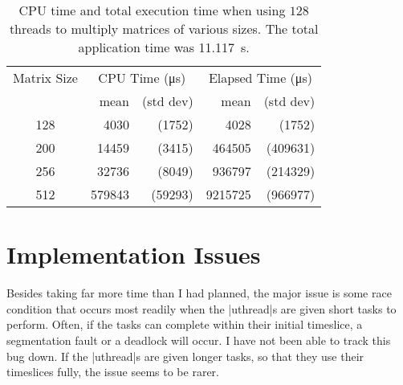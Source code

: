 \documentclass[]{article}
\begin{document}
\begin{table}[h]
  \begin{center}
    \label{tab}
    \begin{minipage}{.8\linewidth}
      \caption{CPU time and total execution time when using $128$
        threads to multiply matrices of various sizes. The total
        application time was \SI{11.117}{\second}.}
      \begin{tabular}{c r r r r}
        \toprule
        Matrix Size
        & \multicolumn{2}{c}{CPU Time (\si{\micro\second})} 
        & \multicolumn{2}{c}{Elapsed Time (\si{\micro\second})} \\
        \cmidrule(r){2-3} \cmidrule(l){4-5}
        &   mean    &(std dev)  &      mean    & (std dev) \\
        \midrule
        128 & \num{4030}  &  (\num{1752})  &  \num{4028}   &  (\num{1752}) \\
        200 & \num{14459} &  (\num{3415})  &  \num{464505} &  (\num{409631}) \\
        256 & \num{32736} &  (\num{8049})  &  \num{936797} &  (\num{214329}) \\
        512 & \num{579843}&  (\num{59293}) &  \num{9215725}&  (\num{966977}) \\
        \bottomrule
      \end{tabular}
    \end{minipage}
  \end{center}
\end{table}


\section{Implementation Issues} 
\label{sec:implemntation_issues}

Besides taking far more time than I had planned, the major issue is
some race condition that occurs most readily when the |uthread|s are
given short tasks to perform. Often, if the tasks can complete within
their initial timeslice, a segmentation fault or a deadlock will
occur. I have not been able to track this bug down. If the |uthread|s
are given longer tasks, so that they use their timeslices fully, the
issue seems to be rarer.


\end{document}
